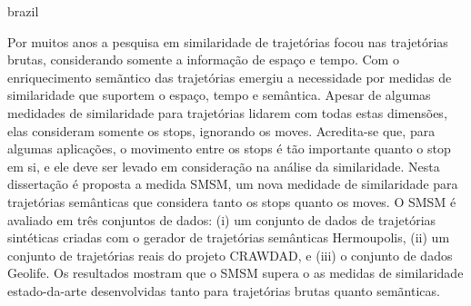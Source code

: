 {
    \begin{otherlanguage*}{brazil}
    \begin{resumo}[Resumo]

        Por muitos anos a pesquisa em similaridade de trajetórias focou nas trajetórias brutas, considerando somente a informação de espaço e tempo. Com o enriquecimento semãntico das trajetórias emergiu a necessidade por medidas de similaridade que suportem o espaço, tempo e semântica. Apesar de algumas medidades de similaridade para trajetórias lidarem com todas estas dimensões, elas consideram somente os stops, ignorando os moves. Acredita-se que, para algumas aplicações, o movimento entre os stops é tão importante quanto o stop em si, e ele deve ser levado em consideração na análise da similaridade.
        Nesta dissertação é proposta a medida SMSM, um nova medidade de similaridade para trajetórias semânticas que considera tanto os stops quanto os moves.
        O SMSM é avaliado em três conjuntos de dados: (i) um conjunto de dados de trajetórias sintéticas criadas com o gerador de trajetórias semânticas Hermoupolis, (ii) um conjunto de trajetórias reais do projeto CRAWDAD, e (iii) o conjunto de dados Geolife. Os resultados mostram que o SMSM supera o as medidas de similaridade estado-da-arte desenvolvidas tanto para trajetórias brutas quanto semãnticas.
        

    \end{resumo}
    \end{otherlanguage*}
}
